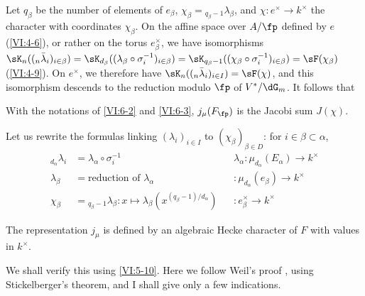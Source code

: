 \documentclass[oneside]{book}
\begin{document}
Let $q_\beta$ be the number of elements of $e_\beta$, 
  $\chi_\beta={}_{q_\beta-1}\lambda_\beta$, and 
$\chi:e^\times \to k^\times$ the character with coordinates $\chi_\beta$. On the 
affine space over $A/\fp$ defined by $e$ (\ref{VI:4-6}), or rather on the torus 
$e_\beta^\times$, we have isomorphisms 
  $\sK_n((_n\bar\lambda_i)_{i\in\beta}) = \sK_{d_\beta}((\lambda_\beta \circ \sigma_i^{-1})_{i\in\beta}) =\sK_{q_\beta-1}((\chi_\beta\circ \sigma_i^{-1})_{i\in\beta}) = \sF(\chi_\beta)$ (\ref{VI:4-9}). 
  On $e^\times$, we therefore have $\sK_n((_n\bar\lambda_i)_{i\in I}) = \sF(\chi)$, 
and this isomorphism descends to the reduction modulo $\fp$ of $V^\ast/\dG_m$. 
It follows that





\begin{proposition_}\label{VI:6-4}
With the notations of \ref{VI:6-2} and \ref{VI:6-3}, $j_\mu(F_\fp)$ is the 
Jacobi sum $J(\chi)$. 
\end{proposition_}

Let us rewrite the formulas linking $(\lambda_i)_{i\in I}$ to 
  $(\chi_\beta)_{\beta\in D}$: for $i\in \beta\subset \alpha$, 
\begin{align*}
  _{d_\alpha} \lambda_i &= \lambda_\alpha\circ \sigma_i^{-1} && \lambda_\alpha:\mu_{d_\alpha}(E_\alpha) \to k^\times \\
  \lambda_\beta &= \text{reduction of $\lambda_\alpha$} && :\mu_{d_\alpha}(e_\beta) \to k^\times \\
  \chi_\beta &= {}_{q_\beta-1}\lambda_\beta: x\mapsto \lambda_\beta(x^{(q_\beta-1)/d_\alpha}) && :e_\beta^\times \to k^\times 
\end{align*}





\begin{theorem_}\label{VI:6-5}
The representation $j_\mu$ is defined by an algebraic Hecke character 
of $F$ with values in $k^\times$. 
\end{theorem_}

We shall verify this using \ref{VI:5-10}. Here we follow Weil's 
proof \cite{we52,we74-2}, using Stickelberger's theorem, 
and I shall give only a few indications. 





\subsection{}\label{VI:6-6}
\end{document}
